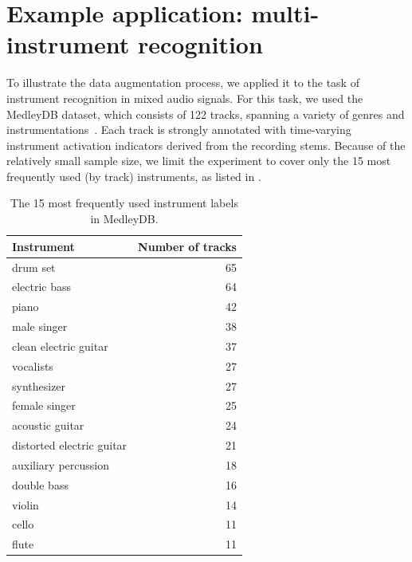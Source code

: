 \documentclass{article}
\begin{document}
\section{Example application: multi-instrument recognition}

To illustrate the data augmentation process, we applied it to the task of instrument
recognition in mixed audio signals.  For this task, we used the MedleyDB dataset, which
consists of 122 tracks, spanning a variety of genres and
instrumentations~\cite{bittner2014medleydb}.  Each track is strongly annotated with 
time-varying instrument activation indicators derived from the recording stems.
Because of the relatively small sample size, we limit the experiment to cover only 
the 15 most frequently used (by track) instruments, as listed in .

\begin{table}
\caption{The 15 most frequently used instrument labels in MedleyDB.\label{medleytags}}
\centering
\small
    \begin{tabular}{lr}
        \toprule
        Instrument & Number of tracks\\
        \midrule
        drum set                    & 65\\
        electric bass               & 64\\
        piano                       & 42 \\
        male singer                 & 38 \\
        clean electric guitar       & 37\\
        vocalists                   & 27\\
        synthesizer                 & 27\\
        female singer               & 25\\
        acoustic guitar             & 24\\
        distorted electric guitar   & 21\\
        auxiliary percussion        & 18\\
        double bass                 & 16\\
        violin                      & 14\\
        cello                       & 11\\
        flute                       & 11\\
        \bottomrule
    \end{tabular}
\end{table}
\end{document}
